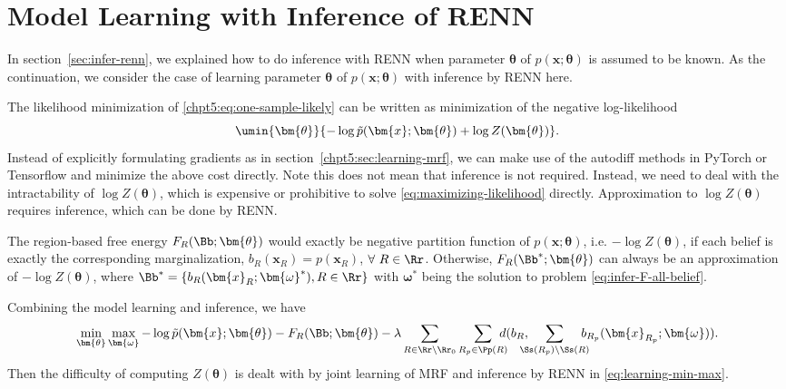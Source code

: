 \section{Model Learning with Inference of RENN}
\label{sec:model-learning-with-renn}
In section~\ref{sec:infer-renn}, we explained how to do inference with RENN when parameter $\bm{\theta}$ of $p(\bm{x}; \bm{\theta})$ is assumed to be known. As the continuation, we consider the case of learning parameter $\bm{\theta}$ of $p(\bm{x}; \bm{\theta})$ with inference by RENN here.

The likelihood minimization of \eqref{chpt5:eq:one-sample-likely} can be written as minimization of the negative log-likelihood
\begin{equation}\label{eq:maximizing-likelihood}
  \umin{\bm{\theta}}{ -\log{\tilde{p}(\bm{x}; \bm{\theta})} + \log{Z(\bm{\theta})}}.
\end{equation}
Instead of explicitly formulating gradients as in section~\ref{chpt5:sec:learning-mrf}, we can make use of the autodiff methods in PyTorch or Tensorflow and minimize the above cost directly. Note this does not mean that inference is not required. Instead, we need to deal with the intractability of $\log{Z(\bm{\theta})}$, which is expensive or prohibitive to solve \eqref{eq:maximizing-likelihood} directly. Approximation to $\log{Z(\bm{\theta})}$ requires inference, which can be done by RENN. 

The region-based free energy $F_R(\Bb;\bm{\theta})$ would exactly be negative partition function of $p(\bm{x};\bm{\theta})$, i.e. $-\log{Z(\bm{\theta})}$, if each belief is exactly the corresponding marginalization, $b_R(\bm{x}_R)=p(\bm{x}_{R})$, $\forall~R\in \Rr$. Otherwise, $F_R(\Bb^{\ast};\bm{\theta})$ can always be an approximation of $-\log{Z(\bm{\theta})}$, where $\Bb^{\ast}= \{b_R(\bm{x}_R; \bm{\omega}^{\ast}), R\in \Rr\}$ with $\bm{\omega}^{\ast}$ being the solution to problem \eqref{eq:infer-F-all-belief}.

Combining the model learning and inference, we have
\begin{align}\label{eq:learning-min-max}
  \min_{\bm{\theta}}\max_{\bm{\omega}} -\log{\tilde{p}(\bm{x}; \bm{\theta})} - F_R(\Bb; \bm{\theta}) 
  -\lambda \sum_{R\in \Rr \backslash \Rr_0} \sum_{R_p \in \Pp(R)}\!\!\!\!\!d( b_R, \!\!\!\!\! \sum_{\Ss(R_p)\backslash \Ss(R)}\!\!\!\!\! b_{R_p}(\bm{x}_{R_p}; \bm{\omega})).
\end{align}
Then the difficulty of computing $Z(\bm{\theta})$ is dealt with by joint learning of MRF and inference by RENN in \eqref{eq:learning-min-max}.


